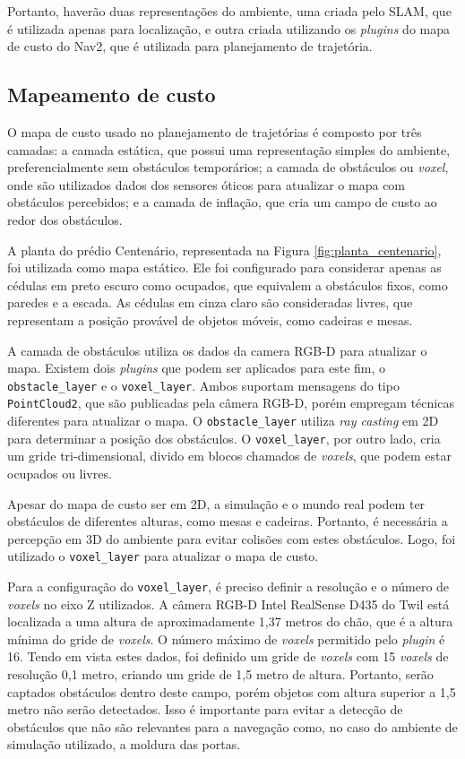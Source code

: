 \documentclass[repeatfields,xlists,xpacks,oneside,yearsonly]{ufrgscca}
\begin{document}
Portanto, haverão duas representações do ambiente, uma criada pelo
SLAM, que é utilizada apenas para localização, e outra criada
utilizando os \textit{plugins} do mapa de custo do Nav2, que é
utilizada para planejamento de trajetória.

\subsection{Mapeamento de custo}

O mapa de custo usado no planejamento de trajetórias é composto por
três camadas: a camada estática, que possui uma representação simples
do ambiente, preferencialmente sem obstáculos temporários; a camada
de obstáculos ou \textit{voxel}, onde são utilizados dados dos
sensores óticos para atualizar o mapa com obstáculos percebidos; e a
camada de inflação, que cria um campo de custo ao redor dos
obstáculos.

A planta do prédio Centenário, representada na Figura
\ref{fig:planta_centenario}, foi utilizada como mapa estático. Ele
foi configurado para considerar apenas as cédulas em preto escuro
como ocupados, que equivalem a obstáculos fixos, como paredes e a
escada. As cédulas em cinza claro são consideradas livres, que
representam a posição provável de objetos móveis, como cadeiras e
mesas.

A camada de obstáculos utiliza os dados da camera RGB-D para
atualizar o mapa. Existem dois \textit{plugins} que podem ser
aplicados para este fim, o \texttt{obstacle\_layer} e o
\texttt{voxel\_layer}. Ambos suportam mensagens do tipo
\texttt{PointCloud2}, que são publicadas pela câmera RGB-D, porém
empregam técnicas diferentes para atualizar o mapa.  O \texttt{obstacle\_layer} utiliza
\textit{ray casting} em 2D para determinar a posição dos obstáculos.
O \texttt{voxel\_layer}, por outro lado, cria um gride
tri-dimensional, divido em blocos chamados de \textit{voxels}, que
podem estar ocupados ou livres.

Apesar do mapa de custo ser em 2D, a simulação e o mundo real podem
ter obstáculos de diferentes alturas, como mesas e cadeiras.
Portanto, é necessária a percepção em 3D do ambiente para evitar
colisões com estes obstáculos. Logo, foi utilizado o
\texttt{voxel\_layer} para atualizar o mapa de custo.

Para a configuração do \texttt{voxel\_layer}, é preciso definir a
resolução e o número de \textit{voxels} no eixo Z utilizados. A
câmera RGB-D Intel RealSense D435 do Twil está localizada a uma
altura de aproximadamente 1,37 metros do chão, que é a altura mínima
do gride de \textit{voxels}. O número máximo de \textit{voxels}
permitido pelo \textit{plugin} é 16. Tendo em vista estes dados, foi
definido um gride de \textit{voxels} com 15 \textit{voxels} de
resolução 0,1 metro, criando um gride de 1,5 metro de altura.
Portanto, serão captados obstáculos dentro deste campo, porém objetos
com altura superior a 1,5 metro não serão detectados. Isso é
importante para evitar a detecção de obstáculos que não são
relevantes para a navegação como, no caso do ambiente de simulação
utilizado, a moldura das portas.
\end{document}
